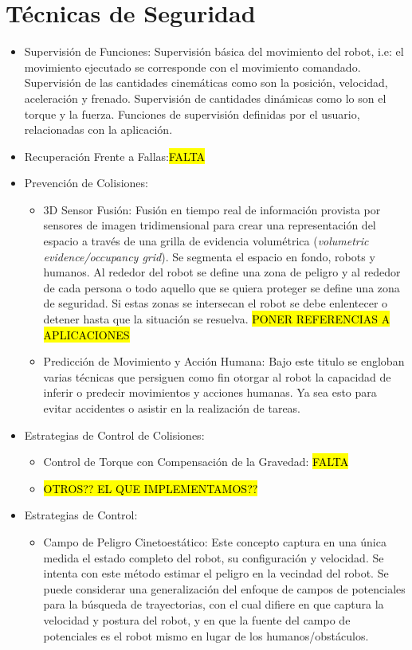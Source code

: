 \documentclass[withindex,glossary]{cam-thesis}
\begin{document}
\section{Técnicas de Seguridad} \label{sec: Guía Seguridad :: Técnicas Seguridad}
\begin{itemize}
\item Supervisión de Funciones: Supervisión básica del movimiento del robot, i.e: el movimiento ejecutado se corresponde con el movimiento comandado. Supervisión de las cantidades cinemáticas como son la posición, velocidad, aceleración y frenado. Supervisión de cantidades dinámicas como lo son el torque y la fuerza. Funciones de supervisión definidas por el usuario, relacionadas con la aplicación.
\item Recuperación Frente a Fallas:\hl{FALTA}
\item Prevención de Colisiones:
  \begin{itemize}
  	\item 3D Sensor Fusión: Fusión en tiempo real de información provista por sensores de imagen tridimensional para crear una representación del espacio a través de una grilla de evidencia volumétrica (\textit{volumetric evidence/occupancy grid}). Se segmenta el espacio en fondo, robots y humanos. Al rededor del robot se define una zona de peligro y al rededor de cada persona o todo aquello que se quiera proteger se define una zona de seguridad. Si estas zonas se intersecan el robot se debe enlentecer o detener hasta que la situación se resuelva. \hl{PONER REFERENCIAS A APLICACIONES}
    \item Predicción de Movimiento y Acción Humana: Bajo este titulo se engloban varias técnicas que persiguen como fin otorgar al robot la capacidad de inferir o predecir movimientos y acciones humanas. Ya sea esto para evitar accidentes o asistir en la realización de tareas. 
  \end{itemize}
\item Estrategias de Control de Colisiones:
  \begin{itemize}
    \item Control de Torque con Compensación de la Gravedad: \hl{FALTA}
    \item \hl{OTROS?? EL QUE IMPLEMENTAMOS??}
  \end{itemize}
\item Estrategias de Control:
  \begin{itemize}
  	\item Campo de Peligro Cinetoestático: Este concepto captura en una única medida el estado completo del robot, su configuración y velocidad. Se intenta con este método  estimar el peligro en la vecindad del robot. Se puede considerar una generalización del enfoque de campos de potenciales para la búsqueda de trayectorias, con el cual difiere en que captura la velocidad y postura del robot, y en que la fuente del campo de potenciales es el robot mismo en lugar de los humanos/obstáculos.

\end{itemize}
\end{itemize}
\end{document}
